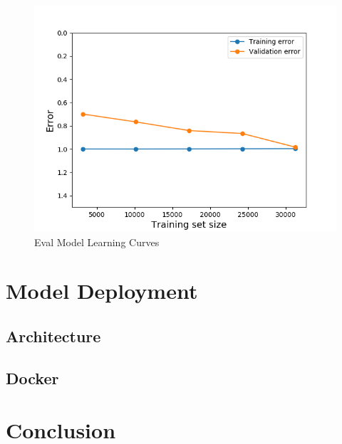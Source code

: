 \begin{Schunk}
\begin{figure}[H]

{\centering \includegraphics[width=1\linewidth]{../../models/training/evaluator_rf_tuned_large_curves} 

}

\caption[Eval Model Learning Curves]{Eval Model Learning Curves}\label{fig:evaluator_lc}
\end{figure}
\end{Schunk}

\hypertarget{model-deployment}{%
\section{Model Deployment}\label{model-deployment}}

\hypertarget{architecture}{%
\subsection{Architecture}\label{architecture}}

\hypertarget{docker}{%
\subsection{Docker}\label{docker}}

\hypertarget{conclusion}{%
\section{Conclusion}\label{conclusion}}

